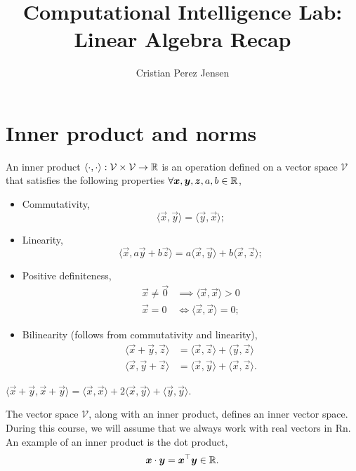 \documentclass[justified,nobib]{tufte-handout}
\title{Computational Intelligence Lab: Linear Algebra Recap}
\author{Cristian Perez Jensen}
\newcommand{\ang}[1]{\langle #1 \rangle}
\begin{document}
\maketitle
\newpage
\tableofcontents
\newpage{}

\section{Inner product and norms}

\begin{definition}
    An inner product $\ang{\cdot,\cdot}: \mathcal{V} \times \mathcal{V} \to \R$ is an operation
    defined on a vector space $\mathcal{V}$ that satisfies the following properties $\forall \bm{x},\bm{y},\bm{z},a,b\in \mathbb{R}$,
    \begin{itemize}
        \item Commutativity, \[
                \ang{\vec{x},\vec{y}} = \ang{\vec{y},\vec{x}};
            \]
        \item Linearity, \[
                \ang{\vec{x},a \vec{y} + b \vec{z}} = a \ang{\vec{x},\vec{y}} + b\ang{\vec{x},\vec{z}};
            \]
        \item Positive definiteness,
            \begin{align*}
                \vec{x} \neq \vec{0} &\implies \ang{\vec{x},\vec{x}} > 0 \\
                \vec{x} = 0 &\iff \ang{\vec{x},\vec{x}} = 0;
            \end{align*}
        \item Bilinearity (follows from commutativity and linearity),
            \begin{align*}
                \ang{\vec{x} + \vec{y}, \vec{z}} &= \ang{\vec{x},\vec{z}} + \ang{\vec{y},\vec{z}} \\
                \ang{\vec{x},\vec{y} + \vec{z}} &= \ang{\vec{x},\vec{y}} + \ang{\vec{x},\vec{z}}.
            \end{align*}
    \end{itemize}
\end{definition}

\begin{corollary}
    $\ang{\vec{x}+\vec{y},\vec{x}+\vec{y}} = \ang{\vec{x},\vec{x}} + 2\ang{\vec{x},\vec{y}} + \ang{\vec{y},\vec{y}}$.
\end{corollary}

The vector space $\mathcal{V}$, along with an inner product, defines an inner vector space. During this course,
we will assume that we always work with real vectors in Rn. An example of an inner product is the dot
product, \[
    \bm{x}\cdot \bm{y} = \bm{x}^\top \bm{y} \in \mathbb{R}.
\]
\end{document}
